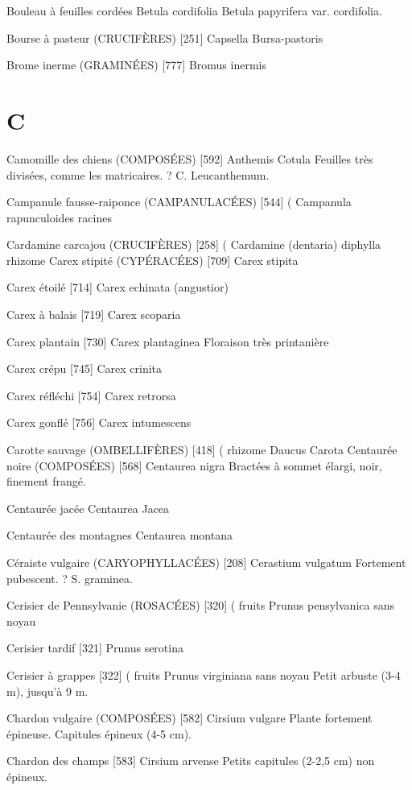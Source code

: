 Bouleau à feuilles cordées
				Betula cordifolia
    Betula papyrifera var. cordifolia.

Bourse à pasteur (CRUCIFÈRES)  [251]
				Capsella Bursa-pastoris

Brome inerme (GRAMINÉES)  [777]
				Bromus inermis

\chapter*{C}

Camomille des chiens (COMPOSÉES)  [592]
				Anthemis Cotula
Feuilles très divisées, comme les matricaires. ? C. Leucanthemum.

Campanule fausse-raiponce (CAMPANULACÉES)  [544]		(
				Campanula rapunculoides			racines

Cardamine carcajou (CRUCIFÈRES)  [258]				 (
				Cardamine (dentaria) diphylla	       rhizome
Carex stipité (CYPÉRACÉES)  [709]
				Carex stipita

Carex étoilé  [714]
				Carex echinata (angustior)

Carex à balais  [719]
				Carex scoparia

Carex plantain  [730]
				Carex plantaginea
Floraison très printanière

Carex crépu  [745]
				Carex crinita

Carex réfléchi  [754]
				Carex retrorsa

Carex gonflé  [756]
				Carex intumescens

Carotte sauvage (OMBELLIFÈRES)  [418]			( rhizome
				Daucus Carota
Centaurée noire (COMPOSÉES)  [568]
				Centaurea nigra
Bractées à sommet élargi, noir, finement frangé.

Centaurée jacée
				Centaurea Jacea

Centaurée des montagnes
				Centaurea montana

Céraiste vulgaire (CARYOPHYLLACÉES)  [208]
				Cerastium vulgatum
Fortement pubescent. ? S. graminea.

Cerisier de Pennsylvanie (ROSACÉES)  [320]		( fruits
				Prunus pensylvanica			sans noyau

Cerisier tardif  [321]
				Prunus serotina

Cerisier à grappes  [322]						( fruits
				Prunus virginiana			sans noyau
Petit arbuste (3-4 m), jusqu’à 9 m.

Chardon vulgaire (COMPOSÉES)  [582]
				Cirsium vulgare
Plante fortement épineuse. Capitules épineux (4-5 cm).

Chardon des champs  [583]
				Cirsium arvense
Petits capitules (2-2,5 cm) non épineux.

